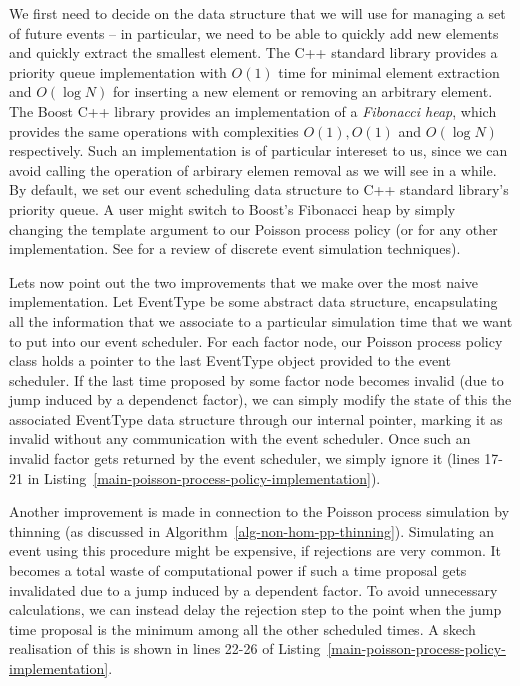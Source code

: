 \documentclass[report.tex]{subfiles}
\begin{document}
We first need to decide on the data structure that we will use for managing
a set of future events -- in particular, we need to be able to quickly
add new elements and quickly extract the smallest element. The C++ standard
library provides a priority queue implementation with $O(1)$ time for
minimal element extraction and $O(\log N)$ for inserting a new element
or removing an arbitrary element. The Boost C++ library \cite{boost-library}
provides an implementation of a \textit{Fibonacci heap}, which provides the
same operations with complexities $O(1), O(1)$ and $O(\log N)$ respectively.
Such an implementation is of particular intereset to us, since we can avoid
calling the operation of arbirary elemen removal as we will see in a while.
By default, we set our event scheduling data structure to C++ standard library's
priority queue. A user might switch to Boost's Fibonacci heap by simply changing
the template argument to our Poisson process policy (or for any other implementation.
See \citet[Chapter XIV Section 5]{devroye2013non} for a review of discrete event simulation techniques).

Lets now point out the two improvements that we make over the most naive
implementation.
Let EventType be some abstract data structure, encapsulating all the
information that we associate to a particular simulation time that
we want to put into our event scheduler.
For each factor node, our Poisson process policy class holds a pointer
to the last EventType object provided to the event scheduler.
If the last time proposed by some factor node becomes invalid (due
to jump induced by a dependenct factor), we can simply modify the
state of this the associated EventType data structure through our internal pointer,
marking it as invalid without any communication with the event scheduler.
Once such an invalid factor gets returned by the event scheduler, we simply ignore it
(lines 17-21 in Listing~\ref{main-poisson-process-policy-implementation}).

Another improvement is made in connection to the Poisson process simulation
by thinning (as discussed in Algorithm~\ref{alg-non-hom-pp-thinning}).
Simulating an event using this procedure might be expensive, if rejections
are very common. It becomes a total waste of computational power if such a time proposal
gets invalidated due to a jump induced by a dependent factor.
To avoid unnecessary calculations, we can instead delay the
rejection step to the point when the jump time proposal is the minimum among
all the other scheduled times.
A skech realisation of this is shown in lines 22-26 of Listing~\ref{main-poisson-process-policy-implementation}.
\end{document}
